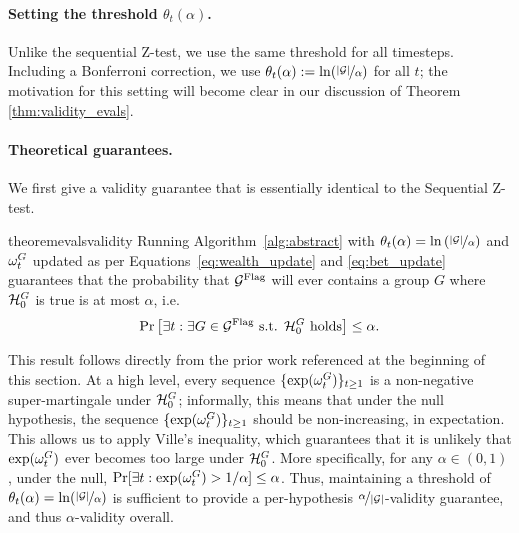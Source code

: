 \paragraph{Setting the threshold $\theta_t(\alpha)$.}
Unlike the sequential Z-test, we use the same threshold for all timesteps. Including a Bonferroni correction, we use $\theta_t(\alpha) :=   \ln(\nicefrac{|{\mathcal{G}}|}{\alpha})$ for all $t$; the motivation for this setting will become clear in our discussion of Theorem \ref{thm:validity_evals}.

\paragraph{Theoretical guarantees.}
We first give a validity guarantee that is essentially identical to the Sequential Z-test. 

\begin{restatable}[Validity]{theorem}{evalsvalidity}\label{thm:validity_evals} Running Algorithm~\ref{alg:abstract} with $\theta_t(\alpha) = \ln{(\nicefrac{|{\mathcal{G}}|}{\alpha})}$ and $\omega_t^G$ updated as per Equations~\eqref{eq:wealth_update} and \eqref{eq:bet_update} guarantees that 
the probability that ${\mathcal {G}^{\text{Flag}}}$ will ever contains a group $G$ where ${\mathcal{H}_0^G}$ is true is at most $\alpha$, i.e. 
\[
\Pr\left[\exists t: \exists G \in {\mathcal {G}^{\text{Flag}}} \text{ s.t. } {\mathcal{H}_0^G} \text{ holds}\right] \leq \alpha.
\]
\end{restatable}
This result follows directly from the prior work referenced at the beginning of this section. At a high level, every sequence $\{\exp(\omega_t^G)\}_{t \geq 1}$ is a non-negative super-martingale under ${\mathcal{H}_0^G}$; informally, this means that under the null hypothesis, the sequence $\{\exp(\omega_t^G)\}_{t \geq 1}$ should be non-increasing, in expectation. 
This allows us to apply Ville's inequality, which guarantees that it is unlikely that $\exp(\omega_t^G)$ ever becomes too large under ${\mathcal{H}_0^G}$. More specifically, for any $\alpha \in (0,1)$, under the null, $\Pr[\exists t: \exp(\omega_t^G) > 1/\alpha] \leq \alpha $. Thus, maintaining a threshold of $\theta_t(\alpha) = \ln(\nicefrac{|{\mathcal{G}}|}{\alpha})$ is sufficient to provide a per-hypothesis ${\nicefrac{\alpha}{|{\mathcal{G}}|}}$-validity guarantee, and thus $\alpha$-validity overall. 

